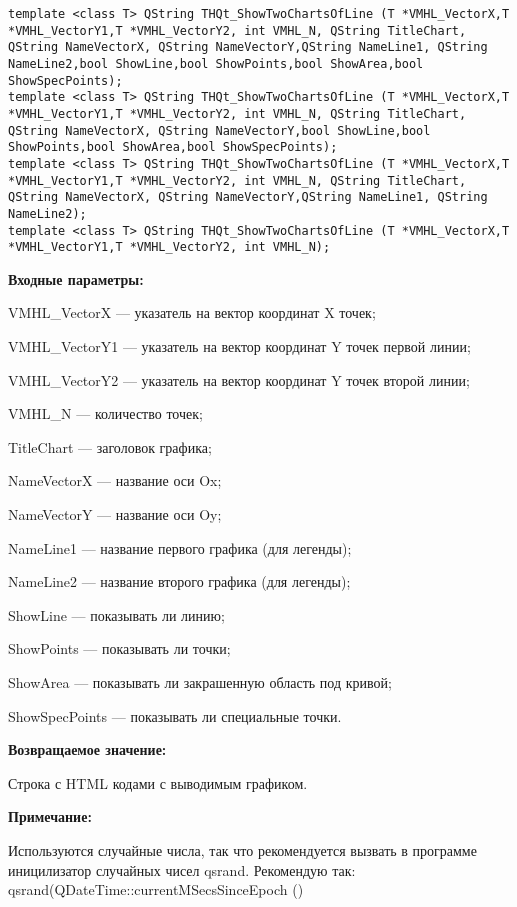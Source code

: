 \documentclass[a4paper,12pt]{article}
\begin{document}
\begin{lstlisting}[label=code_syntax_THQt_ShowTwoChartsOfLine,caption=Синтаксис]
template <class T> QString THQt_ShowTwoChartsOfLine (T *VMHL_VectorX,T *VMHL_VectorY1,T *VMHL_VectorY2, int VMHL_N, QString TitleChart, QString NameVectorX, QString NameVectorY,QString NameLine1, QString NameLine2,bool ShowLine,bool ShowPoints,bool ShowArea,bool ShowSpecPoints);
template <class T> QString THQt_ShowTwoChartsOfLine (T *VMHL_VectorX,T *VMHL_VectorY1,T *VMHL_VectorY2, int VMHL_N, QString TitleChart, QString NameVectorX, QString NameVectorY,bool ShowLine,bool ShowPoints,bool ShowArea,bool ShowSpecPoints);
template <class T> QString THQt_ShowTwoChartsOfLine (T *VMHL_VectorX,T *VMHL_VectorY1,T *VMHL_VectorY2, int VMHL_N, QString TitleChart, QString NameVectorX, QString NameVectorY,QString NameLine1, QString NameLine2);
template <class T> QString THQt_ShowTwoChartsOfLine (T *VMHL_VectorX,T *VMHL_VectorY1,T *VMHL_VectorY2, int VMHL_N);
\end{lstlisting}

\textbf{Входные параметры:}
 
    VMHL\_VectorX --- указатель на вектор координат X точек;
 
    VMHL\_VectorY1 --- указатель на вектор координат Y точек первой линии;
 
    VMHL\_VectorY2 --- указатель на вектор координат Y точек второй линии;
 
    VMHL\_N --- количество точек;
 
    TitleChart --- заголовок графика;
 
    NameVectorX --- название оси Ox;
 
    NameVectorY --- название оси Oy;
 
    NameLine1 --- название первого графика (для легенды);
 
    NameLine2 --- название второго графика (для легенды);
 
    ShowLine --- показывать ли линию;
 
    ShowPoints --- показывать ли точки;
 
    ShowArea --- показывать ли закрашенную область под кривой;
 
    ShowSpecPoints --- показывать ли специальные точки.

\textbf{Возвращаемое значение:}

Строка с HTML кодами с выводимым графиком.

\textbf{Примечание:}

Используются случайные числа, так что рекомендуется вызвать в программе иницилизатор случайных чисел qsrand. Рекомендую так: qsrand(QDateTime::currentMSecsSinceEpoch () %
\end{document}
